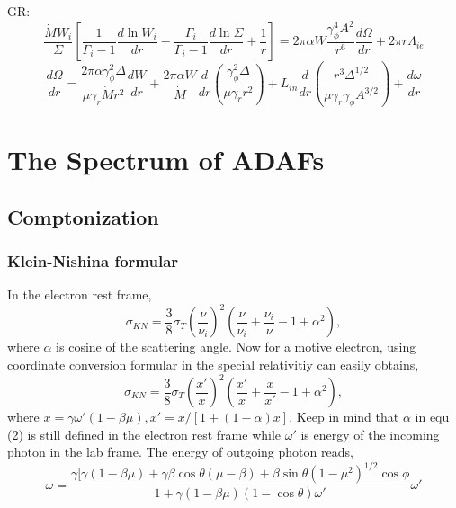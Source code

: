\documentclass[12pt]{book}
\begin{document}
\begin{enumerate}
GR:
\begin{equation}
\frac{\dot M W_i}{\Sigma}\left[\frac{1}{\Gamma_i-1}\frac{d\ln W_i}{dr}-\frac{\Gamma_i}{\Gamma_i-1}\frac{d\ln \Sigma}{dr}+\frac{1}{r}\right]=2\pi \alpha W\frac{\gamma_\phi^4A^2}{r^6}\frac{d\Omega}{dr}+2\pi r\Lambda_{ie}
\end{equation}
\begin{equation}
 \frac{d\Omega}{dr}=\frac{2\pi\alpha\gamma_\phi^2\Delta}{\mu\gamma_r\dot M r^2}\frac{dW}{dr}
+\frac{2\pi \alpha W}{\dot M}\frac{d}{dr}\left(\frac{\gamma_\phi^2\Delta}{\mu\gamma_r r^2}\right)
+L_{in}\frac{d}{dr}\left(\frac{r^3\Delta^{1/2}}{\mu\gamma_r\gamma_\phi A^{3/2}}\right)
+\frac{d\omega}{dr}
\end{equation}

\end{enumerate}

\chapter{The Spectrum of ADAFs}
\section{Comptonization}
\subsection{Klein-Nishina formular}
In the electron rest frame,
\begin{equation}
\sigma_{KN}=\frac{3}{8}\sigma_T\left(\frac{\nu}{\nu_i}\right)^2
\left(\frac{\nu}{\nu_i}+\frac{\nu_i}{\nu}-1+\alpha^2\right),
\end{equation}
where $\alpha$ is cosine of the scattering angle.
Now for a motive electron, using coordinate conversion formular in the special relativitiy can
easily obtains,
\begin{equation}
\sigma_{KN}=\frac{3}{8}\sigma_T\left(\frac{x'}{x}\right)^2
\left(\frac{x'}{x}+\frac{x}{x'}-1+\alpha^2\right),
\end{equation}
where $x=\gamma\omega'(1-\beta\mu),x'=x/[1+(1-\alpha)x]$. Keep in mind that $\alpha$ in equ (2)
is still defined in the electron rest frame while $\omega'$ is energy of the incoming photon 
in the lab frame. The energy of outgoing photon reads,
\begin{equation}
\omega=\frac{\gamma[\gamma(1-\beta\mu)+\gamma\beta\cos\theta(\mu-\beta)+\beta\sin\theta
(1-\mu^2)^{1/2}\cos\phi}{1+\gamma(1-\beta\mu)(1-\cos\theta)\omega'}\omega'
\end{equation} 
\end{document}
